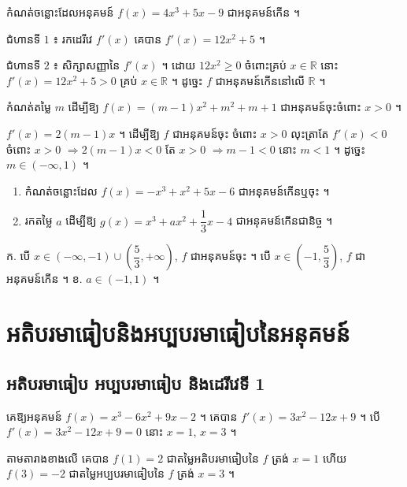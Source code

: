 \begin{example}[លំហាត់គំរូ ១]
កំណត់ចន្លោះដែលអនុគមន៍ $f(x) = 4x^3 + 5x - 9$ ជាអនុគមន៍កើន ។
\end{example}
\ans
ជំហានទី $1$ ៖ រកដេរីវេ $f'(x)$ គេបាន $f'(x) = 12x^2 + 5$ ។

ជំហានទី $2$ ៖ សិក្សាសញ្ញានៃ $f'(x)$ ។ ដោយ $12x^2 \ge 0$ ចំពោះគ្រប់ $x \in \mathbb{R}$ នោះ $f'(x) = 12x^2 + 5 > 0$ គ្រប់ $x \in \mathbb{R}$ ។ ដូច្នេះ $f$ ជាអនុគមន៍កើននៅលើ $\mathbb{R}$ ។

\begin{example}[លំហាត់គំរូ ២]
កំណត់តម្លៃ $m$ ដើម្បីឱ្យ $f(x) = (m - 1)x^2 + m^2 + m + 1$ ជាអនុគមន៍ចុះចំពោះ $x > 0$ ។
\end{example}
\ans
$f'(x) = 2(m - 1)x$ ។ ដើម្បីឱ្យ $f$ ជាអនុគមន៍ចុះ ចំពោះ $x > 0$ លុះត្រាតែ $f'(x) < 0$ ចំពោះ $x > 0$ $\Rightarrow 2(m - 1)x < 0$ តែ $x > 0$ $\Rightarrow m - 1 < 0$ នោះ $m < 1$ ។ ដូច្នេះ $m \in (-\infty, 1)$ ។

\begin{pro}
\begin{enumerate}[a]
  \item កំណត់ចន្លោះដែល $f(x) = -x^3 + x^2 + 5x - 6$ ជាអនុគមន៍កើនឬចុះ ។
  \item រកតម្លៃ $a$ ដើម្បីឱ្យ $g(x) = x^3 + ax^2 + \dfrac{1}{3}x - 4$ ជាអនុគមន៍កើនជានិច្ច ។
\end{enumerate}
\ans
ក. បើ $x \in (-\infty, -1) \cup \left(\dfrac{5}{3}, +\infty\right)$, $f$ ជាអនុគមន៍ចុះ ។ បើ $x \in \left(-1, \dfrac{5}{3}\right)$, $f$ ជាអនុគមន៍កើន ។ \quad ខ. $a \in (-1, 1)$ ។
\end{pro}

\section{អតិបរមាធៀបនិងអប្បបរមាធៀបនៃអនុគមន៍}
\subsection{អតិបរមាធៀប អប្បបរមាធៀប និងដេរីវេទី 1}

\begin{example}[ឧទាហរណ៍]
គេឱ្យអនុគមន៍ $f(x) = x^3 - 6x^2 + 9x - 2$ ។ គេបាន $f'(x) = 3x^2 - 12x + 9$ ។ បើ $f'(x) = 3x^2 - 12x + 9 = 0$ នោះ $x = 1$, $x = 3$ ។
\begin{center}
\end{center}
តាមតារាងខាងលើ គេបាន $f(1) = 2$ ជាតម្លៃអតិបរមាធៀបនៃ $f$ ត្រង់ $x = 1$ ហើយ $f(3) = -2$ ជាតម្លៃអប្បបរមាធៀបនៃ $f$ ត្រង់ $x = 3$ ។
\end{example}

